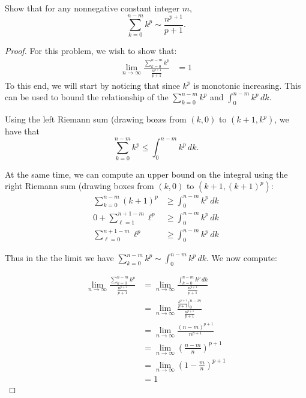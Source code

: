 \documentclass{article}
\newenvironment{problem}[2][Problem]{\begin{trivlist}
\item[\hskip \labelsep {\bfseries #1}\hskip \labelsep {\bfseries #2.}]}{\end{trivlist}}
\theoremstyle{definition}
\begin{document}
\begin{problem}{2.5.7}
    Show that for any nonnegative constant integer $m$, $$\sum_{k = 0}^{n - m}k^p \sim \frac{n^{p+1}}{p+1}.$$
\end{problem}
\begin{proof}
    For this problem, we wish to show that:
    \begin{align}
        \lim_{n \rightarrow \infty} \frac{\sum_{k = 0}^{n - m}k^p}{\frac{n^{p+1}}{p+1}} &= 1 \label{eq:1}
    \end{align}
    To this end, we will start by noticing that since $k^p$ is monotonic increasing. This can be used to bound the relationship of the $\sum_{k=0}^{n-m} k^p$ and $\int_0^{n-m} k^p \, dk$.
    
    Using the left Riemann sum (drawing boxes from $(k, 0)$ to $(k+1, k^p)$, we have that $$\sum_{k = 0}^{n-m} k^p \leq \int_0^{n-m} k^p \,dk.$$
    
    At the same time, we can compute an upper bound on the integral using the right Riemann sum (drawing boxes from $(k, 0)$ to $(k+1, (k+1)^p)$:
    \begin{align*}
        \sum_{k = 0}^{n-m} (k + 1)^p &\geq \int_0^{n-m}k^p \, dk \\
        0 + \sum_{\ell = 1}^{n+1-m} \ell^p &\geq \int_0^{n-m}k^p \, dk \\
        \sum_{\ell = 0}^{n+1-m} \ell^p &\geq \int_0^{n-m}k^p \, dk
    \end{align*}

    Thus in the the limit we have $\sum_{k = 0}^{n-m} k^p \sim \int_0^{n-m}k^p \, dk$. We now compute:

    \begin{align*}
        \lim_{n \rightarrow \infty} \frac{\sum_{k = 0}^{n - m}k^p}{\frac{n^{p+1}}{p+1}} &= \lim_{n \rightarrow \infty} \frac{\int_{k = 0}^{n - m}k^p \, dk}{\frac{n^{p+1}}{p+1}} \\
        &= \lim_{n \rightarrow \infty} \frac{\frac{k^{p+1}}{p+1}\bigg\rvert_0^{n-m}}{\frac{n^{p+1}}{p+1}} \\
        &= \lim_{n \rightarrow \infty} \frac{(n-m)^{p+1}}{n^{p+1}} \\
        &= \lim_{n \rightarrow \infty} (\frac{n-m}{n})^{p+1} \\
        &= \lim_{n \rightarrow \infty} (1 - \frac{m}{n})^{p+1} \\
        &= 1
    \end{align*}
\end{proof}
\end{document}
